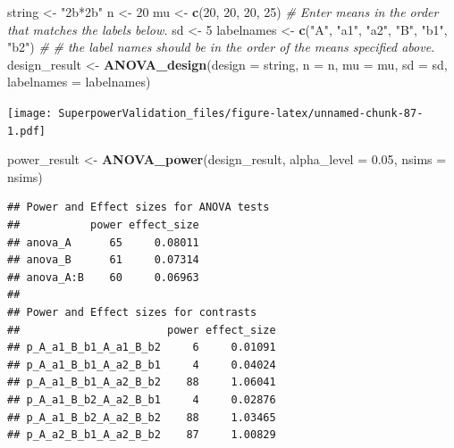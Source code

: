 \documentclass[]{book}
\newenvironment{Shaded}{\begin{snugshade}}{\end{snugshade}}
\newcommand{\CommentTok}[1]{\textcolor[rgb]{0.56,0.35,0.01}{\textit{#1}}}
\newcommand{\DataTypeTok}[1]{\textcolor[rgb]{0.13,0.29,0.53}{#1}}
\newcommand{\DecValTok}[1]{\textcolor[rgb]{0.00,0.00,0.81}{#1}}
\newcommand{\FloatTok}[1]{\textcolor[rgb]{0.00,0.00,0.81}{#1}}
\newcommand{\KeywordTok}[1]{\textcolor[rgb]{0.13,0.29,0.53}{\textbf{#1}}}
\newcommand{\NormalTok}[1]{#1}
\newcommand{\OperatorTok}[1]{\textcolor[rgb]{0.81,0.36,0.00}{\textbf{#1}}}
\newcommand{\StringTok}[1]{\textcolor[rgb]{0.31,0.60,0.02}{#1}}
\begin{document}
\begin{Shaded}
\begin{Highlighting}[]
\NormalTok{string <-}\StringTok{ "2b*2b"}
\NormalTok{n <-}\StringTok{ }\DecValTok{20}
\NormalTok{mu <-}\StringTok{ }\KeywordTok{c}\NormalTok{(}\DecValTok{20}\NormalTok{, }\DecValTok{20}\NormalTok{, }\DecValTok{20}\NormalTok{, }\DecValTok{25}\NormalTok{) }
\CommentTok{# Enter means in the order that matches the labels below.}
\NormalTok{sd <-}\StringTok{ }\DecValTok{5}
\NormalTok{labelnames <-}\StringTok{ }\KeywordTok{c}\NormalTok{(}\StringTok{"A"}\NormalTok{, }\StringTok{"a1"}\NormalTok{, }\StringTok{"a2"}\NormalTok{, }\StringTok{"B"}\NormalTok{, }\StringTok{"b1"}\NormalTok{, }\StringTok{"b2"}\NormalTok{) }\CommentTok{#}
\CommentTok{# the label names should be in the order of the means specified above.}
\NormalTok{design_result <-}\StringTok{ }\KeywordTok{ANOVA_design}\NormalTok{(}\DataTypeTok{design =}\NormalTok{ string,}
                   \DataTypeTok{n =}\NormalTok{ n, }
                   \DataTypeTok{mu =}\NormalTok{ mu, }
                   \DataTypeTok{sd =}\NormalTok{ sd, }
                   \DataTypeTok{labelnames =}\NormalTok{ labelnames)}
\end{Highlighting}
\end{Shaded}

\texttt{[image: SuperpowerValidation\_files/figure-latex/unnamed-chunk-87-1.pdf]}

\begin{Shaded}
\begin{Highlighting}[]
\NormalTok{power_result <-}\StringTok{ }\KeywordTok{ANOVA_power}\NormalTok{(design_result, }\DataTypeTok{alpha_level =} \FloatTok{0.05}\NormalTok{, }\DataTypeTok{nsims =}\NormalTok{ nsims)}
\end{Highlighting}
\end{Shaded}

\begin{verbatim}
## Power and Effect sizes for ANOVA tests
##           power effect_size
## anova_A      65     0.08011
## anova_B      61     0.07314
## anova_A:B    60     0.06963
## 
## Power and Effect sizes for contrasts
##                       power effect_size
## p_A_a1_B_b1_A_a1_B_b2     6     0.01091
## p_A_a1_B_b1_A_a2_B_b1     4     0.04024
## p_A_a1_B_b1_A_a2_B_b2    88     1.06041
## p_A_a1_B_b2_A_a2_B_b1     4     0.02876
## p_A_a1_B_b2_A_a2_B_b2    88     1.03465
## p_A_a2_B_b1_A_a2_B_b2    87     1.00829
\end{verbatim}

\begin{Shaded}
\end{Shaded}
\end{document}

